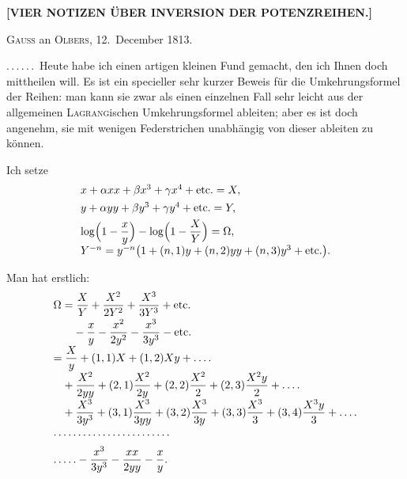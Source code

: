 \clearpage
{}
\begin{center}
\textbf{[VIER NOTIZEN ÜBER INVERSION DER POTENZREIHEN.]}
\end{center}



\begin{center}
\textsc{Gauss} an \textsc{Olbers}, 12.\ December 1813.
\end{center}

\noindent\hspace*{\parindent}.\,.\,.\,.\,.\,.\ Heute habe ich einen artigen kleinen Fund gemacht, den ich Ihnen doch mittheilen
will. Es ist ein specieller sehr kurzer Beweis für die Umkehrungsformel der Reihen: man kann sie zwar
als einen einzelnen Fall sehr leicht aus der allgemeinen \textsc{Lagrang}ischen Umkehrungsformel
ableiten; aber es ist doch angenehm, sie mit wenigen Federstrichen unabhängig von dieser ableiten zu
können.

\noindent\hspace*{\parindent}Ich setze
\[
\begin{array}{l}
x+\alpha xx+\beta x^3+\gamma x^4+\text{etc.}=X,\\[4pt]
y+\alpha yy+\beta y^3+\gamma y^4+\text{etc.}=Y,\\[4pt]
\log\Bigl(1-\dfrac{x}{y}\Bigr)-\log\Bigl(1-\dfrac{X}{Y}\Bigr)=\Omega,\\[4pt]
Y^{-n}=y^{-n}\bigl(1+(n,1)y+(n,2)yy+(n,3)y^3+\text{etc.}\bigr).
\end{array}
\]

\noindent Man hat erstlich:
\[
\begin{array}{l}
\Omega=\dfrac{X}{Y}+\dfrac{X^2}{2Y^2}+\dfrac{X^3}{3Y^3}+\text{etc.}\\[6pt]
\hphantom{\Omega=}-\dfrac{x}{y}-\dfrac{x^2}{2y^2}-\dfrac{x^3}{3y^3}-\text{etc.}\\[6pt]
=\dfrac{X}{y}+(1,1)X+(1,2)Xy+.\,.\,.\,.\\[6pt]
\hphantom{=}+\dfrac{X^2}{2yy}+(2,1)\dfrac{X^2}{2y}+(2,2)\dfrac{X^2}{2}+(2,3)\dfrac{X^2y}{2}+.\,.\,.\,.\\[6pt]
\hphantom{=}+\dfrac{X^3}{3y^3}+(3,1)\dfrac{X^3}{3yy}+(3,2)\dfrac{X^3}{3y}+(3,3)\dfrac{X^3}{3}+(3,4)\dfrac{X^3y}{3}+.\,.\,.\,.\\[6pt]
.\,.\,.\,.\,.\,.\,.\,.\,.\,.\,.\,.\,.\,.\,.\,.\,.\,.\,.\,.\,.\,.\,.\,.\\[6pt]
.\,.\,.\,.\,.-\dfrac{x^3}{3y^3}-\dfrac{xx}{2yy}-\dfrac{x}{y}.
\end{array}
\]

